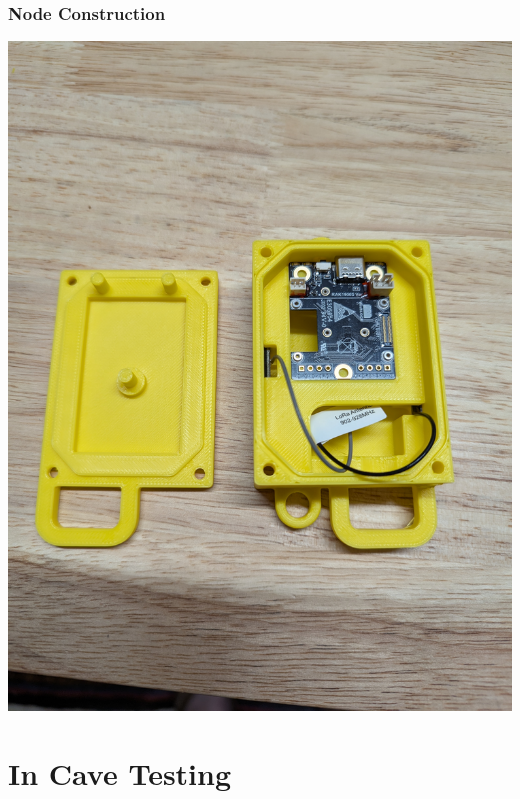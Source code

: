 \documentclass{beamer}
\begin{document}
\begin{frame}
\frametitle{Node Construction}

\begin{center}
\includegraphics[width=.47\textwidth]{../images/new-case.jpg}\hfill
\end{center}

\end{frame}

\section{In Cave Testing}
\end{document}
